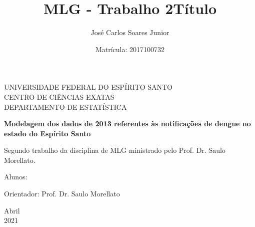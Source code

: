 \documentclass[12pt,a4paper]{article}\usepackage[]{graphicx}\usepackage[]{color}
\title{MLG - Trabalho 2}
\author{José Carlos Soares Junior }
\date{Matrícula: 2017100732}
\begin{document}
\begin{titlepage}
	\begin{center}
	

		\Huge{UNIVERSIDADE FEDERAL DO ESPÍRITO SANTO}\\
		\large{CENTRO DE CIÊNCIAS EXATAS}\\ 
		\large{DEPARTAMENTO DE ESTATÍSTICA}\\ 
\vspace{15pt}
        
        \vspace{85pt}
        
		\textbf{\LARGE{Modelagem dos dados de 2013 referentes às notificações de dengue no estado do Espírito Santo}}
		\title{\large{Título}}
			
	\end{center}
\vspace{1,5cm}
	
	\begin{flushright}

   \begin{list}{}{
      \setlength{\leftmargin}{4.5cm}
      \setlength{\rightmargin}{0cm}
      \setlength{\labelwidth}{0pt}
      \setlength{\labelsep}{\leftmargin}}

      \item Segundo trabalho da disciplina de MLG ministrado pelo Prof. Dr. Saulo Morellato.

      \begin{list}{}{
      \setlength{\leftmargin}{0cm}
      \setlength{\rightmargin}{0cm}
      \setlength{\labelwidth}{0pt}
      \setlength{\labelsep}{\leftmargin}}

			\item Alunos: \
            \item Orientador: Prof. Dr. Saulo Morellato\

      \end{list}
   \end{list}
\end{flushright}
\vspace{1cm}
\begin{center}
		\vspace{\fill}
		 Abril\\
		 2021
			\end{center}
\end{titlepage}
\newpage
\end{document}
